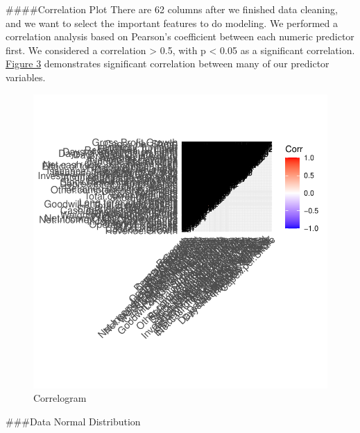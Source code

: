 \documentclass[11pt,]{article}
\begin{document}
\#\#\#\#Correlation Plot There are 62 columns after we finished data
cleaning, and we want to select the important features to do modeling.
We performed a correlation analysis based on Pearson's coefficient
between each numeric predictor first. We considered a correlation
\textgreater{} 0.5, with p \textless{} 0.05 as a significant
correlation. \hyperref[sec:fig3]{Figure 3} demonstrates significant
correlation between many of our predictor variables.

\begin{figure}

{\centering \includegraphics{stock_analysis_files/figure-latex/corrplot-1} 

}

\caption{Correlogram\label{sec:fig3}}\label{fig:corrplot}
\end{figure}

\#\#\#Data Normal Distribution
\end{document}

